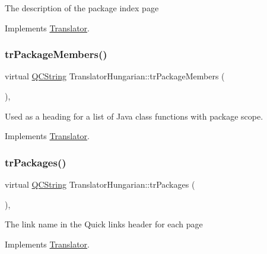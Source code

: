 The description of the package index page 

Implements \mbox{\hyperlink{class_translator}{Translator}}.

\mbox{\label{class_translator_hungarian_a447c8304ce0c40865e5e7c767292ff4e}} 
\subsubsection{\texorpdfstring{trPackageMembers()}{trPackageMembers()}}
{\footnotesize\ttfamily virtual \mbox{\hyperlink{class_q_c_string}{Q\+C\+String}} Translator\+Hungarian\+::tr\+Package\+Members (\begin{DoxyParamCaption}{ }\end{DoxyParamCaption})\hspace{0.3cm}{\ttfamily [inline]}, {\ttfamily [virtual]}}

Used as a heading for a list of Java class functions with package scope. 

Implements \mbox{\hyperlink{class_translator}{Translator}}.

\mbox{\label{class_translator_hungarian_a8374b940a1e9ebd61d7a9f3cbe0637f2}} 
\subsubsection{\texorpdfstring{trPackages()}{trPackages()}}
{\footnotesize\ttfamily virtual \mbox{\hyperlink{class_q_c_string}{Q\+C\+String}} Translator\+Hungarian\+::tr\+Packages (\begin{DoxyParamCaption}{ }\end{DoxyParamCaption})\hspace{0.3cm}{\ttfamily [inline]}, {\ttfamily [virtual]}}

The link name in the Quick links header for each page 

Implements \mbox{\hyperlink{class_translator}{Translator}}.

\mbox{\label{class_translator_hungarian_ae5406366dfc15f47880db0263d1e9ce8}} 
